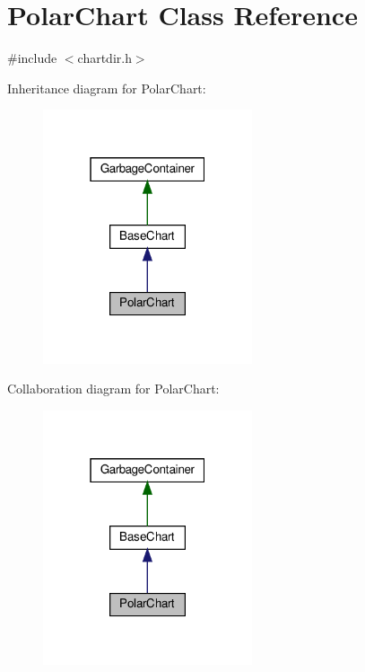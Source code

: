 \hypertarget{class_polar_chart}{}\section{Polar\+Chart Class Reference}
\label{class_polar_chart}


{\ttfamily \#include $<$chartdir.\+h$>$}



Inheritance diagram for Polar\+Chart\+:
\nopagebreak
\begin{figure}[H]
\begin{center}
\leavevmode
\includegraphics[width=175pt]{class_polar_chart__inherit__graph}
\end{center}
\end{figure}


Collaboration diagram for Polar\+Chart\+:
\nopagebreak
\begin{figure}[H]
\begin{center}
\leavevmode
\includegraphics[width=175pt]{class_polar_chart__coll__graph}
\end{center}
\end{figure}
